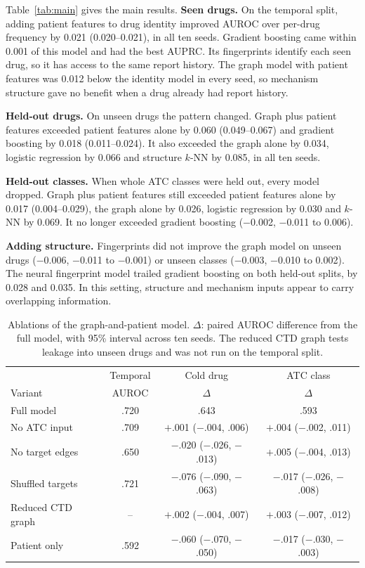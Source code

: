 \documentclass[conference,letterpaper]{IEEEtran}
\begin{document}
Table~\ref{tab:main} gives the main results. \textbf{Seen drugs.} On the temporal split, adding patient features to drug identity improved AUROC over per-drug frequency by 0.021 (0.020--0.021), in all ten seeds. Gradient boosting came within 0.001 of this model and had the best AUPRC. Its fingerprints identify each seen drug, so it has access to the same report history. The graph model with patient features was 0.012 below the identity model in every seed, so mechanism structure gave no benefit when a drug already had report history.

\textbf{Held-out drugs.} On unseen drugs the pattern changed. Graph plus patient features exceeded patient features alone by 0.060 (0.049--0.067) and gradient boosting by 0.018 (0.011--0.024). It also exceeded the graph alone by 0.034, logistic regression by 0.066 and structure $k$-NN by 0.085, in all ten seeds.

\textbf{Held-out classes.} When whole ATC classes were held out, every model dropped. Graph plus patient features still exceeded patient features alone by 0.017 (0.004--0.029), the graph alone by 0.026, logistic regression by 0.030 and $k$-NN by 0.069. It no longer exceeded gradient boosting ($-$0.002, $-$0.011 to 0.006).

\textbf{Adding structure.} Fingerprints did not improve the graph model on unseen drugs ($-$0.006, $-$0.011 to $-$0.001) or unseen classes ($-$0.003, $-$0.010 to 0.002). The neural fingerprint model trailed gradient boosting on both held-out splits, by 0.028 and 0.035. In this setting, structure and mechanism inputs appear to carry overlapping information.

\begin{table}[t]
\centering
\caption{Ablations of the graph-and-patient model. $\Delta$: paired AUROC difference from the full model, with 95\% interval across ten seeds. The reduced CTD graph tests leakage into unseen drugs and was not run on the temporal split.}
\label{tab:abl}
\scriptsize
\setlength{\tabcolsep}{2pt}
\begin{tabular}{lccc}
\toprule
 & Temporal & Cold drug & ATC class \\
Variant & AUROC & $\Delta$ & $\Delta$ \\
\midrule
Full model & .720 & .643 & .593 \\
No ATC input & .709 & $+$.001 ($-$.004, .006) & $+$.004 ($-$.002, .011) \\
No target edges & .650 & $-$.020 ($-$.026, $-$.013) & $+$.005 ($-$.004, .013) \\
Shuffled targets & .721 & $-$.076 ($-$.090, $-$.063) & $-$.017 ($-$.026, $-$.008) \\
Reduced CTD graph & -- & $+$.002 ($-$.004, .007) & $+$.003 ($-$.007, .012) \\
Patient only & .592 & $-$.060 ($-$.070, $-$.050) & $-$.017 ($-$.030, $-$.003) \\
\bottomrule
\end{tabular}
\end{table}
\end{document}
